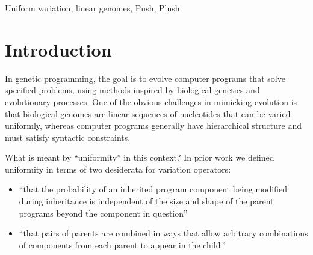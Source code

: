 \documentclass[graybox]{svmult}
\begin{document}

\begin{keywords}
Uniform variation, linear genomes, Push, Plush
\end{keywords}


\section{Introduction}
\label{Introduction}

In genetic programming, the goal is to evolve computer programs that solve specified problems, using methods inspired by biological genetics and evolutionary processes.
One of the obvious challenges in mimicking evolution is that biological genomes are linear sequences of nucleotides that can be varied uniformly, whereas computer programs generally have hierarchical structure and must satisfy syntactic constraints.

What is meant by ``uniformity'' in this context? In prior work \cite{Spector:2013:GPTP} we defined uniformity in terms of two desiderata for variation operators:

\begin{itemize}
\item ``that the probability of an inherited program component being modified during inheritance is independent of the size and shape of the parent programs beyond the component in question'' 
\item ``that pairs of parents are combined in ways that allow arbitrary combinations of components from each parent to appear in the child.''
\end{itemize}
\end{document}
